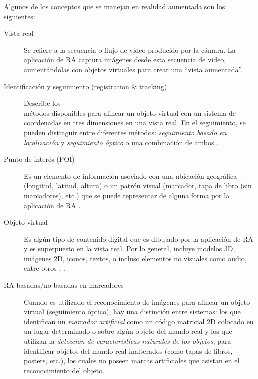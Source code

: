 Algunos de los conceptos que se manejan en realidad aumentada son los siguientes:
\begin{description}
  \item [Vista real] 
  Se refiere a la secuencia o flujo de video producido por la cámara. La aplicación de RA captura imágenes desde esta secuencia de video, aumentándolas con objetos virtuales para crear una ``vista aumentada''. \cite{1320421}
  \item [Identificación y seguimiento (registration \& tracking)] 
  Describe los\\ métodos disponibles para alinear un objeto virtual con un sistema de coordenadas 
  en tres dimensiones en una vista real. En el seguimiento, se pueden distinguir entre diferentes métodos: \textit{seguimiento basado en localización} y \textit{seguimiento óptico} o una combinación de ambos \cite{conf/iswc/2007, 1320421}.
  \item[Punto de interés (POI)]
  Es un elemento de información asociado con una ubicación geográfica (longitud, latitud, altura) o un patrón visual (marcador, tapa de libro (sin marcadores), etc.) que se puede representar de alguna forma por la aplicación de RA \cite{1320421, Azuma:2001:RAA:616073.618862}.
  \item [Objeto virtual] 
  Es algún tipo de contenido digital que es dibujado por la aplicación de RA y es superpuesto en la vista real. 
  Por lo general, incluye modelos 3D, imágenes 2D, iconos, textos, o incluso elementos no visuales como audio, entre otros \cite{conf/iswc/2007}, \cite{1320421}. 
  \item [RA basadas/no basadas en marcadores] 
  Cuando es utilizado el reconocimiento de imágenes para alinear un objeto virtual (seguimiento óptico), hay una distinción entre sistemas:
  los que identifican un \textit{marcador artificial} como un código matricial 2D colocado en un lugar determinado o sobre algún objeto del mundo real y los que utilizan la \textit{detección de características naturales de los objetos}, para identificar objetos del mundo real inalterados (como tapas de libros, posters, etc.), los cuales no poseen marcas artificiales que asistan en el reconocimiento del objeto.

\end{description}
